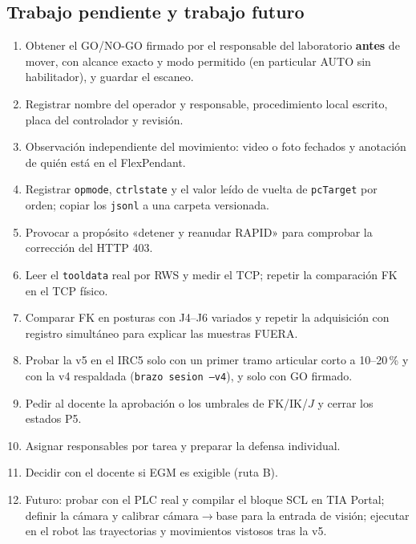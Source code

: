 \documentclass[10pt,a4paper]{article}
\begin{document}
\subsection{Trabajo pendiente y trabajo futuro}
\begin{enumerate}[leftmargin=*]
\item Obtener el GO/NO-GO firmado por el responsable del laboratorio \textbf{antes} de mover, con alcance exacto y modo permitido (en particular AUTO sin habilitador), y guardar el escaneo.
\item Registrar nombre del operador y responsable, procedimiento local escrito, placa del controlador y revisión.
\item Observación independiente del movimiento: video o foto fechados y anotación de quién está en el FlexPendant.
\item Registrar \texttt{opmode}, \texttt{ctrlstate} y el valor leído de vuelta de \texttt{pcTarget} por orden; copiar los \texttt{jsonl} a una carpeta versionada.
\item Provocar a propósito «detener y reanudar RAPID» para comprobar la corrección del HTTP 403.
\item Leer el \texttt{tooldata} real por RWS y medir el TCP; repetir la comparación FK en el TCP físico.
\item Comparar FK en posturas con J4--J6 variados y repetir la adquisición con registro simultáneo para explicar las muestras FUERA.
\item Probar la v5 en el IRC5 solo con un primer tramo articular corto a 10--20\,\% y con la v4 respaldada (\texttt{brazo sesion --v4}), y solo con GO firmado.
\item Pedir al docente la aprobación o los umbrales de FK/IK/$J$ y cerrar los estados P5.
\item Asignar responsables por tarea y preparar la defensa individual.
\item Decidir con el docente si EGM es exigible (ruta B).
\item Futuro: probar con el PLC real y compilar el bloque SCL en TIA Portal; definir la cámara y calibrar cámara$\to$base para la entrada de visión; ejecutar en el robot las trayectorias y movimientos vistosos tras la v5.
\end{enumerate}
\end{document}
